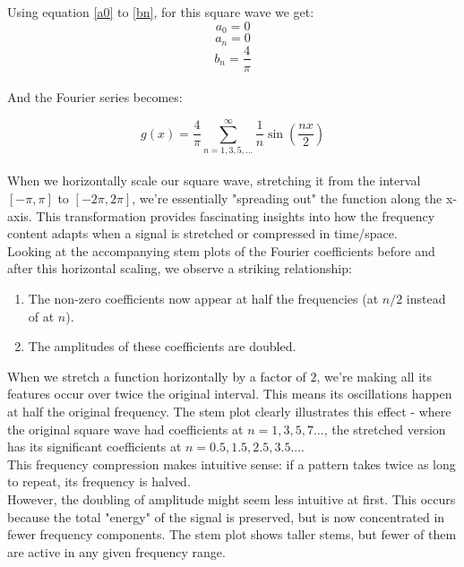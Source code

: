 \documentclass{article}
\begin{document}
Using equation \ref{a0} to \ref{bn}, for this square wave we get:
    \begin{equation}
    a_0 = 0
    \end{equation}
    \begin{equation}
    a_n = 0
    \end{equation}
    \begin{equation}
    b_n = \frac{4}{\pi}
    \end{equation}\\
And the Fourier series becomes:

    \begin{equation}
g(x) = \frac{4}{\pi} \sum_{n=1,3,5,...}^{\infty} \frac{1}{n} \sin\left(\frac{nx}{2}\right)
    \end{equation}\\
When we horizontally scale our square wave, stretching it from the interval $[-\pi, \pi]$ to $[-2\pi, 2\pi]$, we're essentially "spreading out" the function along the x-axis. This transformation provides fascinating insights into how the frequency content adapts when a signal is stretched or compressed in time/space.\\

Looking at the accompanying stem plots of the Fourier coefficients before and after this horizontal scaling, we observe a striking relationship:\\
\begin{enumerate}
\item The non-zero coefficients now appear at half the frequencies (at $n/2$ instead of at $n$).
\item The amplitudes of these coefficients are doubled.
\end{enumerate}
When we stretch a function horizontally by a factor of $2$, we're making all its features occur over twice the original interval. This means its oscillations happen at half the original frequency. The stem plot clearly illustrates this effect - where the original square wave had coefficients at $n = 1, 3, 5, 7...$, the stretched version has its significant coefficients at $n = 0.5, 1.5, 2.5, 3.5...$.\\

This frequency compression makes intuitive sense: if a pattern takes twice as long to repeat, its frequency is halved.\\

However, the doubling of amplitude might seem less intuitive at first. This occurs because the total "energy" of the signal is preserved, but is now concentrated in fewer frequency components. The stem plot shows taller stems, but fewer of them are active in any given frequency range.\\
\end{document}
